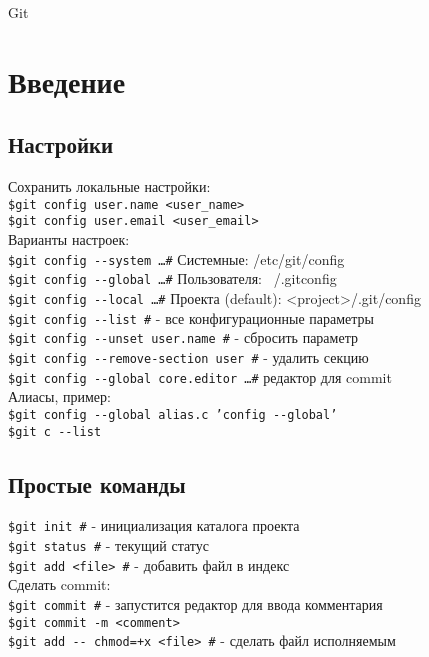 \documentclass[12pt, a4paper]{article}
\begin{document}
	
{\Huge Git}

\section{Введение}

\subsection{Настройки}

Сохранить локальные настройки: \\
\indent \texttt{\$git config user.name <user\_name>} \\
\indent \texttt{\$git config user.email <user\_email>} \\

\noindent Варианты настроек: \\
\indent \texttt{\$git config {-}-system \ldots \indent \#} Системные: /etc/git/config \\
\indent \texttt{\$git config {-}-global \ldots \indent \#} Пользователя: ~/.gitconfig \\
\indent \texttt{\$git config {-}-local \ldots \indent \#}  Проекта (default):	<project>/.git/config \\

\noindent\texttt{\$git config {-}-list \indent \#} - все конфигурационные параметры \\
\texttt{\$git config {-}-unset user.name \indent \#} - сбросить параметр \\ 
\texttt{\$git config {-}-remove-section user \indent \#} - удалить секцию \\ 
\texttt{\$git config {-}-global core.editor \ldots \indent \#} редактор для commit \\
	
\noindent Алиасы, пример: \\
\indent\texttt{\$git config {-}-global alias.c 'config {-}-global'} \\
\indent\texttt{\$git c {-}-list}


\subsection{Простые команды}

\texttt{\$git init \indent \#} - инициализация каталога проекта \\
\texttt{\$git status \indent \#} - текущий статус \\
\texttt{\$git add <file> \indent \#} - добавить файл в индекс \\
Сделать commit:\\
\indent\texttt{\$git commit \indent \#} - запустится редактор для ввода комментария \\
\indent\texttt{\$git commit -m <comment>} \\
\texttt{\$git add {-}- chmod=+x <file> \indent \#} - сделать файл исполняемым \\
	
\end{document}
